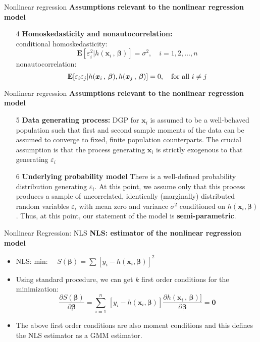 \documentclass{beamer}
\begin{document}
\begin{frame}{Nonlinear regression}
\textbf{Assumptions relevant to the nonlinear regression model}\\
\medskip
\begin{itemize}
 \item[4] \textbf{Homoskedasticity and nonautocorrelation:}\\
 \medskip
 conditional homoskedasticity:
 $$
 \mathbf{E}[\varepsilon_i^2| h(\bm{x}_i\, , \,\bm{\beta})] = \sigma^2, \quad i=1,2,\dots,n
 $$
 nonautocorrelation:
 $$
 \mathbf{E}[\varepsilon_i\varepsilon_j| h(\bm{x}_i\, , \,\bm{\beta}), h(\bm{x}_j\, , \,\bm{\beta})] = 0, \quad \textnormal{for all~}i\neq j
 $$
\end{itemize}
\end{frame}
\begin{frame}{Nonlinear regression}
\textbf{Assumptions relevant to the nonlinear regression model}\\
\medskip
\begin{itemize}
\item[5] \textbf{Data generating process:} DGP for $\bm{x}_i$ is assumed to be a well-behaved population such that first and second sample moments of the data can be assumed to converge to fixed, finite population counterparts. The crucial assumption is that the process generating $\bm{x}_i$ is strictly exogenous to that generating $\varepsilon_i$
\item[6] \textbf{Underlying probability model} There is a well-defined probability distribution generating $\varepsilon_i$. At this point, we assume only that this process produces a sample of uncorrelated, identically (marginally) distributed random variables $\varepsilon_i$ with mean zero and variance $\sigma^2$ conditioned on $h(\bm{x}_i, \bm{\beta})$. Thus, at this point, our statement of the model is \textbf{semi-parametric}.
\end{itemize}
\end{frame}
\begin{frame}{Nonlinear Regression: NLS}
\textbf{NLS: estimator of the nonlinear regression model}\\
\bigskip
\begin{itemize}
\item NLS: \qquad min:~~ $S(\bm{\beta})=\sum[y_i-h(\bm{x}_i, \bm{\beta})]^2$
\medskip
\item Using standard procedure, we can get $k$ first order conditions for the minimization:
$$
\frac{\partial S(\bm{\beta})}{\partial \bm{\beta} } = 
\sum_{i=1}^n \, [y_i-h(\bm{x}_i, \bm{\beta})] 
\frac{\partial h(\bm{x}_i\, , \,\bm{\beta})]}{\partial \bm{\beta}}
= \bm{0}
$$

\end{itemize}
\smallskip
\begin{itemize}
\item The above first order conditions are also moment conditions and this defines the NLS estimator as a GMM estimator.
\end{itemize}
\end{frame}
\end{document}
